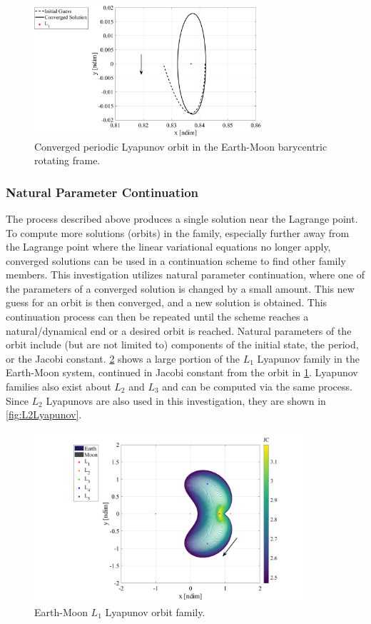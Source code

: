 \begin{figure}[ht]
    \centering
    \includegraphics[width=0.75\textwidth]{figures/Lyapunov.pdf}
    \caption{Converged periodic Lyapunov orbit in the Earth-Moon barycentric rotating frame.}
    \label{fig:Lyapunov}
\end{figure}

\subsubsection{Natural Parameter Continuation}
The process described above produces a single solution near the Lagrange point. To compute more
solutions (orbits) in the family, especially further away from the Lagrange point where the linear
variational equations no longer apply, converged solutions can be used in a continuation scheme to
find other family members. This investigation utilizes natural parameter continuation, where one of
the parameters of a converged solution is changed by a small amount. This new guess for an orbit is
then converged, and a new solution is obtained. This continuation process can then be repeated
until the scheme reaches a natural/dynamical end or a desired orbit is reached. Natural parameters
of the orbit include (but are not limited to) components of the initial state, the period, or the
Jacobi constant. \cref{fig:L1Lyapunov} shows a large portion of the $L_{1}$ Lyapunov family in the
Earth-Moon system, continued in Jacobi constant from the orbit in \cref{fig:Lyapunov}. Lyapunov
families also exist about $L_{2}$ and $L_{3}$ and can be computed via the same process. Since
$L_{2}$ Lyapunovs are also used in this investigation, they are shown in \cref{fig:L2Lyapunov}.

\begin{figure}[ht]
    \centering
    \includegraphics[width=0.9\textwidth]{figures/L1LyapunovFamily.pdf}
    \caption{Earth-Moon $L_{1}$ Lyapunov orbit family.}
    \label{fig:L1Lyapunov}
\end{figure}

